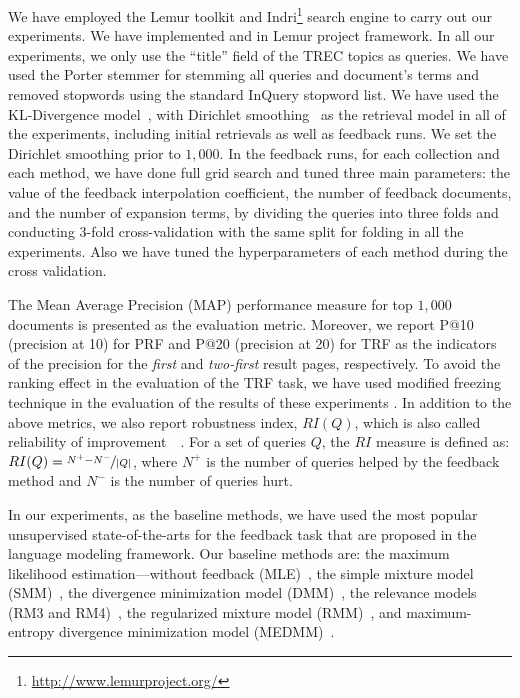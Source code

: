 We have employed the Lemur toolkit and Indri\footnote{\url{http://www.lemurproject.org/}} search engine to carry out our experiments. We have implemented \acswlm and \acrswlm in Lemur project framework. 
In all our experiments, we only use the ``title'' field of the TREC topics as queries. 
We have used the Porter stemmer for stemming all queries and document's terms and removed stopwords using the standard InQuery stopword list. 
We have used the KL-Divergence model~\citep{Lafferty:2001}, with Dirichlet smoothing~\citep{Zhai:2001} as the retrieval model in all of the experiments, including initial retrievals as well as feedback runs.
We set the Dirichlet smoothing prior to $1,000$.  In the feedback runs, for each collection and each method, we have done full grid search and tuned three main parameters: the value of the feedback interpolation coefficient, the number of feedback documents, and the number of expansion terms, by dividing the queries into three folds and conducting 3-fold cross-validation with the same split for folding in all the experiments.  Also we have tuned the hyperparameters of each method during the cross validation.

%
The Mean Average Precision (MAP) performance measure for top $1,000$ documents is presented as the evaluation metric. 
Moreover, we report P@10 (precision at 10) for PRF and P@20 (precision at 20) for TRF as the indicators of the precision for the \emph{first} and \emph{two-first} result pages, respectively.  
To avoid the ranking effect in the evaluation of the TRF task, we have used modified freezing technique in the evaluation of the results of these experiments \citep{cirillo:1969,Harman:1992,Ruthven:2003}. In addition to the above metrics, we also report robustness index, $RI(Q)$, which is also called reliability of improvement~~\citep{Collins-Thompson:2007}. For a set of
queries $Q$, the $RI$ measure is defined as: $RI(Q) = \nicefrac{N^+ - N^-}{|Q|}$, where $N^+$ is the number of queries helped by the feedback method and $N^-$ is the number of queries hurt.

In our experiments, as the baseline methods, we have used the most popular unsupervised state-of-the-arts for the feedback task that are proposed in the language modeling framework. 
Our baseline methods are: the maximum likelihood estimation---without feedback (MLE)~\citep{Lafferty:2001}, the simple mixture model (SMM)~\citep{Zhai:SMM:2001},  the divergence minimization model (DMM)~\citep{Zhai:SMM:2001}, the relevance models (RM3 and RM4)~\citep{Abdul-jaleel:2004,Lavrenko:2001}, the regularized mixture model (RMM)~\citep{Tao:2006}, and maximum-entropy divergence minimization model (MEDMM)~\citep{Lv:2014}. 


